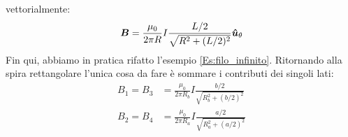 \begin{Es}
vettorialmente:
\begin{equation*}
 \boldsymbol{B} = \frac{\mu_0}{2\pi R}I\frac{L/2}{\sqrt{R^2+(L/2)^2}}\boldsymbol{\hat {u}}_\theta
\end{equation*}
Fin qui, abbiamo in pratica rifatto l'esempio \ref{Es:filo_infinito}. Ritornando alla spira rettangolare l'unica cosa da fare è sommare i contributi dei singoli lati:
\begin{align*}
 B_1 = B_3 &= \frac{\mu_0}{2\pi R_b}I\frac{b/2}{\sqrt{R_b^2+(b/2)^2}}\\
 B_2 = B_4 &= \frac{\mu_0}{2\pi R_a}I\frac{a/2}{\sqrt{R_a^2+(a/2)^2}}\\
\end{align*}
\begin{figure}[htbp]
 \centering
 \qquad

\end{figure}
\end{Es}
